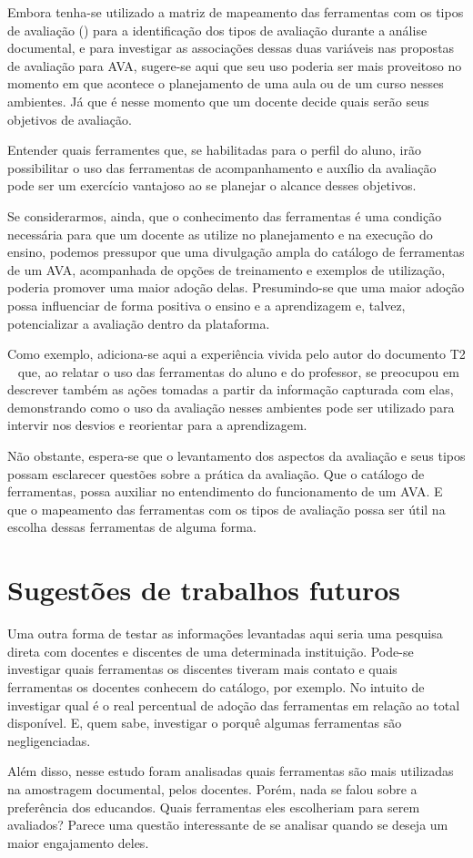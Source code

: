 
Embora tenha-se utilizado a matriz de mapeamento das ferramentas com os tipos de avaliação () para a identificação dos tipos de avaliação durante a análise documental, e para investigar as associações dessas duas variáveis nas propostas de avaliação para AVA, sugere-se aqui que seu uso poderia ser mais proveitoso no momento em que acontece o planejamento de uma aula ou de um curso nesses ambientes. Já que é nesse momento que um docente decide quais serão seus objetivos de avaliação.

Entender quais ferramentes que, se habilitadas para o perfil do aluno, irão possibilitar o uso das ferramentas de acompanhamento e auxílio da avaliação pode ser um exercício vantajoso ao se planejar o alcance desses objetivos. 

Se considerarmos, ainda, que o conhecimento das ferramentas é uma condição necessária para que um docente as utilize no planejamento e na execução do ensino, podemos pressupor que uma divulgação ampla do catálogo de ferramentas de um AVA, acompanhada de opções de treinamento e exemplos de utilização, poderia promover uma maior adoção delas. Presumindo-se que uma maior adoção possa influenciar de forma positiva o ensino e a aprendizagem e, talvez, potencializar a avaliação dentro da plataforma.

Como exemplo, adiciona-se aqui a experiência vivida pelo autor do documento T2 ~\cite{t2@ead} que, ao relatar o uso das ferramentas do aluno e do professor, se preocupou em descrever também as ações tomadas a partir da informação capturada com elas, demonstrando como o uso da avaliação nesses ambientes pode ser utilizado para intervir nos desvios e reorientar para a aprendizagem. 

Não obstante, espera-se que o levantamento dos aspectos da avaliação e seus tipos possam esclarecer questões sobre a prática da avaliação. Que o catálogo de ferramentas, possa auxiliar no entendimento do funcionamento de um AVA. E que o mapeamento das ferramentas com os tipos de avaliação possa ser útil na escolha dessas ferramentas de alguma forma. 

\section{Sugestões de trabalhos futuros}%
Uma outra forma de testar as informações levantadas aqui seria uma pesquisa direta com docentes e discentes de uma determinada instituição. Pode-se investigar quais ferramentas os discentes tiveram mais contato e quais ferramentas os docentes conhecem do catálogo, por exemplo. No intuito de investigar qual é o real percentual de adoção das ferramentas em relação ao total disponível. E, quem sabe, investigar o porquê algumas ferramentas são negligenciadas.

Além disso, nesse estudo foram analisadas quais ferramentas são mais utilizadas na amostragem documental, pelos docentes. Porém, nada se falou sobre a preferência dos educandos. Quais ferramentas eles escolheriam para serem avaliados? Parece uma questão interessante de se analisar quando se deseja um maior engajamento deles.
